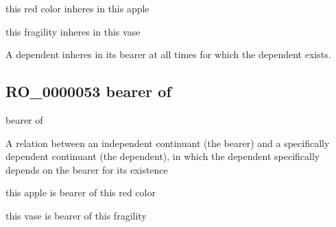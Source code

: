 \documentclass[letterpaper,10pt,english]{sphinxmanual}
\begin{document}
\begin{sphinxShadowBox}

\sphinxAtStartPar
this red color inheres in this apple

\sphinxAtStartPar
this fragility inheres in this vase
\end{sphinxShadowBox}

\begin{sphinxShadowBox}

\sphinxAtStartPar
A dependent inheres in its bearer at all times for which the dependent exists.
\end{sphinxShadowBox}

\begin{sphinxShadowBox}

\sphinxAtStartPar
{}
\end{sphinxShadowBox}
\begin{quote}

\ignorespaces \end{quote}


\subsection{RO\_0000053 \sphinxhyphen{} bearer of}
\label{\detokenize{doc-RO_0000053:ro-0000053-bearer-of}}\label{\detokenize{doc-RO_0000053:index-0}}\label{\detokenize{doc-RO_0000053::doc}}
\begin{sphinxShadowBox}

\sphinxAtStartPar
bearer of
\end{sphinxShadowBox}

\begin{sphinxShadowBox}

\sphinxAtStartPar
A relation between an independent continuant (the bearer) and a specifically dependent continuant (the dependent), in which the dependent specifically depends on the bearer for its existence
\end{sphinxShadowBox}

\begin{sphinxShadowBox}

\sphinxAtStartPar
this apple is bearer of this red color

\sphinxAtStartPar
this vase is bearer of this fragility
\end{sphinxShadowBox}
\end{document}
